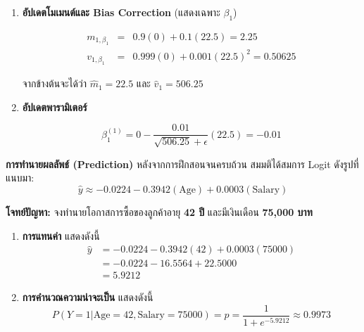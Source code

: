 \begin{enumerate}
    แทนค่าตัวเลขจากตารางข้อมูลและผลการคำนวณในขั้นตอนก่อนหน้า:
    
   \begin{eqnarray} \nonumber
   g_{\beta_0} &=& (0.5-0) + (0.5-0) = 1.0  \\  \nonumber
   g_{\beta_1} &=& (0.5-0)(20) + (0.5-0)(25) = 10 + 12.5 = 22.5 \\ \nonumber
   g_{\beta_2} &=& (0.5-0)(20000) + (0.5-0)(25000) = 10000 + 12500 = 22500
   \end{eqnarray}
   
 
    
    
    \item \textbf{อัปเดตโมเมนต์และ Bias Correction} (แสดงเฉพาะ $\beta_1$)
    
    \begin{eqnarray} \nonumber
    	m_{1, \beta_1} &=& 0.9(0) + 0.1(22.5) = 2.25 \\ \nonumber
    	v_{1, \beta_1} &=& 0.999(0) + 0.001(22.5)^2 = 0.50625
    \end{eqnarray}

    จากข้างต้นจะได้ว่า $ \hat{m}_1 = 22.5$ และ $ \hat{v}_1 = 506.25$
    \item \textbf{อัปเดตพารามิเตอร์} 
    
    $$\beta_1^{(1)} = 0 - \frac{0.01}{\sqrt{506.25} + \epsilon}(22.5) = -0.01$$
\end{enumerate}

\noindent
\textbf{การทำนายผลลัพธ์ (Prediction)}
หลังจากการฝึกสอนจนครบถ้วน สมมติได้สมการ Logit ดังรูปที่แนบมา:
$$\hat{y} \approx -0.0224 - 0.3942(\text{Age}) + 0.0003(\text{Salary})$$

\noindent
\textbf{โจทย์ปัญหา:} จงทำนายโอกาสการซื้อของลูกค้าอายุ \textbf{42 ปี} และมีเงินเดือน \textbf{75,000 บาท}

\begin{enumerate}
	\item \textbf{การแทนค่า } แสดงดังนี้ 
	\begin{align*}
		\hat{y} &= -0.0224 - 0.3942(42) + 0.0003(75000) \\
		&= -0.0224 - 16.5564 + 22.5000 \\
		&= 5.9212
	\end{align*}
	
	\item \textbf{การคำนวณความน่าจะเป็น } แสดงดังนี้
	$$P(Y=1 | \text{Age}=42, \text{Salary}=75000) = p = \frac{1}{1 + e^{-5.9212}} \approx 0.9973$$
\end{enumerate}

